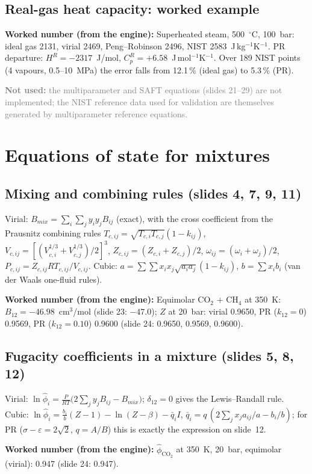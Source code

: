 \documentclass[11pt,a4paper]{article}
\newcommand{\num}[1]{\par\noindent\textbf{Worked number (from the engine):} #1\par}
\newcommand{\notused}[1]{\par\noindent\textcolor{gray}{\textbf{Not used:} #1}\par}
\begin{document}
\subsection{Real-gas heat capacity: worked example}
\num{Superheated steam, 500~$^\circ$C, 100~bar: ideal gas 2131, virial 2469, Peng--Robinson 2496,
NIST 2583~J\,kg$^{-1}$K$^{-1}$. PR departure: $H^R=-2317$~J/mol, $C_p^R=+6.58$~J\,mol$^{-1}$K$^{-1}$.
Over 189 NIST points (4 vapours, 0.5--10~MPa) the error falls from 12.1\,\% (ideal gas) to 5.3\,\% (PR).}
\notused{the multiparameter and SAFT equations (slides 21--29) are not implemented; the NIST reference data
used for validation are themselves generated by multiparameter reference equations.}

\section{Equations of state for mixtures}

\subsection{Mixing and combining rules (slides 4, 7, 9, 11)}
Virial: $B_{mix}=\sum_i\sum_jy_iy_jB_{ij}$ (exact), with the cross coefficient from the Prausnitz combining
rules $T_{c,ij}=\sqrt{T_{c,i}T_{c,j}}(1-k_{ij})$, $V_{c,ij}=[(V_{c,i}^{1/3}+V_{c,j}^{1/3})/2]^3$,
$Z_{c,ij}=(Z_{c,i}+Z_{c,j})/2$, $\omega_{ij}=(\omega_i+\omega_j)/2$, $P_{c,ij}=Z_{c,ij}RT_{c,ij}/V_{c,ij}$.
Cubic: $a=\sum\sum x_ix_j\sqrt{a_ia_j}(1-k_{ij})$, $b=\sum x_ib_i$ (van der Waals one-fluid rules).
\num{Equimolar CO$_2$ + CH$_4$ at 350~K: $B_{12}=-46.98$~cm$^3$/mol (slide 23: $-47.0$); $Z$ at 20~bar:
virial 0.9650, PR ($k_{12}=0$) 0.9569, PR ($k_{12}=0.10$) 0.9600 (slide 24: 0.9650, 0.9569, 0.9600).}

\subsection{Fugacity coefficients in a mixture (slides 5, 8, 12)}
Virial: $\ln\hat\phi_i=\frac{P}{RT}\big(2\sum_jy_jB_{ij}-B_{mix}\big)$; $\delta_{12}=0$ gives the
Lewis--Randall rule. Cubic: $\ln\hat\phi_i=\frac{b_i}{b}(Z-1)-\ln(Z-\beta)-\bar q_iI$,
$\bar q_i=q\,(2\sum_jx_ja_{ij}/a-b_i/b)$; for PR ($\sigma-\varepsilon=2\sqrt2$, $q=A/B$) this is exactly the
expression on slide~12.
\num{$\hat\phi_{\mathrm{CO_2}}$ at 350~K, 20~bar, equimolar (virial): 0.947 (slide 24: 0.947).}
\end{document}
